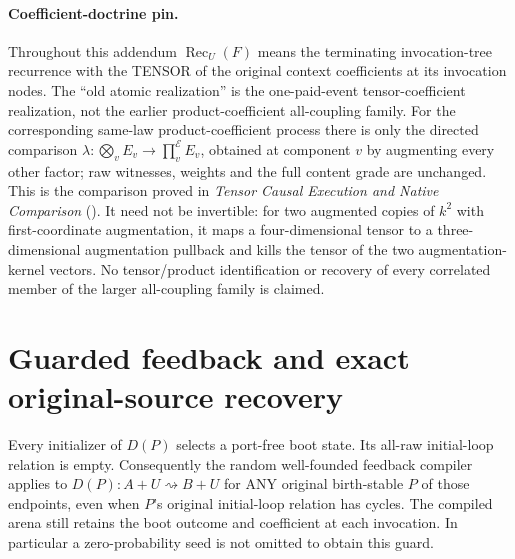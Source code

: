 \documentclass[11pt]{article}
\begin{document}
\paragraph{Coefficient-doctrine pin.}
Throughout this addendum $\operatorname{Rec}_U(F)$ means the terminating
invocation-tree recurrence with the TENSOR of the original context
coefficients at its invocation nodes. The ``old atomic realization'' is the
one-paid-event tensor-coefficient realization, not the earlier
product-coefficient all-coupling family. For the corresponding same-law
product-coefficient process there is only the directed comparison
$\lambda:\bigotimes_v E_v\to\prod_v^{\mathcal E}E_v$, obtained at component
$v$ by augmenting every other factor; raw witnesses, weights and the full
content grade are unchanged. This is the comparison proved in
\emph{Tensor Causal Execution and Native Comparison}
(\texttt{}).
It need not be invertible: for two augmented copies of $k^2$ with first-coordinate
augmentation, it maps a four-dimensional tensor to a three-dimensional
augmentation pullback and kills the tensor of the two augmentation-kernel
vectors. No tensor/product identification or recovery of every correlated
member of the larger all-coupling family is claimed.

\section{Guarded feedback and exact original-source recovery}
Every initializer of $D(P)$ selects a port-free boot state. Its all-raw
initial-loop relation is empty. Consequently the random well-founded
feedback compiler applies to $D(P):A+U\rightsquigarrow B+U$ for ANY original
birth-stable $P$ of those endpoints, even when $P$'s original initial-loop
relation has cycles. The compiled arena still retains the boot outcome and
coefficient at each invocation. In particular a zero-probability seed is
not omitted to obtain this guard.
\end{document}
